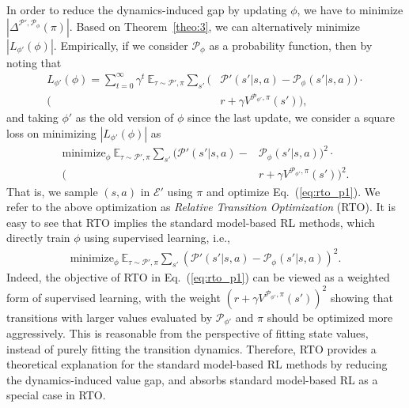 \documentclass[letterpaper]{article} %
\def\E{{\mathbb{E}}}
\def\P{{\mathcal{P}}}
\begin{document}
In order to reduce the dynamics-induced gap by updating $\phi$, we have to minimize $|\Delta^{\P',\P_{\phi}}(\pi)|$.
Based on Theorem~\ref{theo:3}, we can alternatively minimize $|L_{\phi'}(\phi)|$. Empirically, if we consider $\P_{\phi}$ as a probability function, then by noting that
{\small
\begin{align}
L_{\phi'}(\phi)=
\sum_{t=0}^{\infty}
\gamma^t\
\E_{\tau \sim \P',\pi}
\sum_{s'}
\big(
&\P'(s'|s,a) - \P_{\phi}(s'|s,a)
\big) \cdot  \nonumber \\
\big(
&r+\gamma V^{\P_{\phi'},\pi}(s')
\big),
\end{align}
}and taking $\phi'$ as the old version of $\phi$ since the last update, we consider a square loss on minimizing $|L_{\phi'}(\phi)|$ as
{\small
\begin{align}
\text{minimize}_{\phi}\
\E_{\tau \sim \P',\pi}
\sum_{s'}
\big(\P'(s'|s,a)-&\P_{\phi}(s'|s,a)\big)^2 \cdot \nonumber \\
\big(
&r+\gamma V^{\P_{\phi'},\pi}(s')
\big)^2.
\label{eq:rto_p1}
\end{align}
}That is, we sample $(s,a)$ in $\mathcal{E}'$ using $\pi$ and optimize Eq.~(\ref{eq:rto_p1}).
We refer to the above optimization as \emph{Relative Transition Optimization} (RTO).
It is easy to see that RTO implies the standard model-based RL methods, which directly train $\phi$ using supervised learning, i.e.,
{\small
\begin{equation}
\begin{aligned}
\text{minimize}_{\phi} \ \E_{\tau \sim \P',\pi}\sum_{s'}
\left(\P'(s'|s,a)-\P_{\phi}(s'|s,a)\right)^2.
\end{aligned}
\end{equation}
}Indeed, the objective of RTO in Eq.~(\ref{eq:rto_p1}) can be viewed as a weighted form of supervised learning, with the weight $(r+\gamma V^{\P_{\phi'},\pi}(s'))^2$ showing that transitions with larger values evaluated by $\P_{\phi'}$ and $\pi$ should be optimized more aggressively. This is reasonable from the perspective of fitting state values, instead of purely fitting the transition dynamics. Therefore, RTO provides a theoretical explanation for the standard model-based RL methods by reducing the dynamics-induced value gap, and absorbs standard model-based RL as a special case in RTO.
\end{document}
